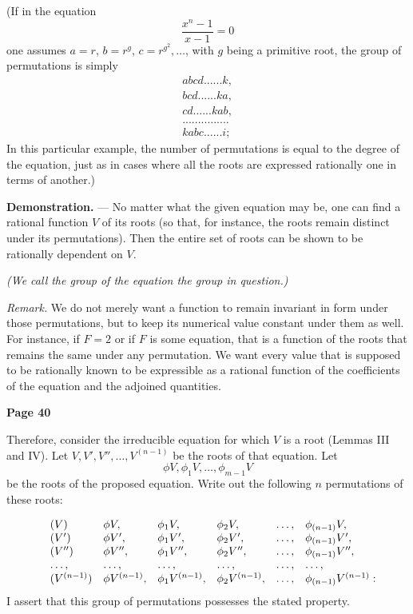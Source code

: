 \documentclass{article}
\begin{document}
\smallskip

\noindent
(If in the equation
\[
\frac{x^n - 1}{x - 1} = 0
\]
one assumes \(a = r\), \(b = r^g\), \(c = r^{g^2}, \dots\), with \(g\) being a primitive root, the group of permutations is simply
\[
\begin{matrix}
abcd......k,\\
bcd......ka,\\
cd......kab,\\
...............\\
kabc......i;
\end{matrix}
\]
In this particular example, the number of permutations is equal to the degree of the equation, just as in cases where all the roots are expressed rationally one in terms of another.)

\medskip

\noindent
\textbf{Demonstration.} --- No matter what the given equation may be, one can find a rational function \(V\) of its roots (so that, for instance, the roots remain distinct under its permutations). Then the entire set of roots can be shown to be rationally dependent on \(V\).

\medskip

\noindent
\emph{(We call the group of the equation the group in question.)}

\smallskip

\noindent
\emph{Remark.} We do not merely want a function to remain invariant in form under those permutations, but to keep its numerical value constant under them as well. For instance, if \(F = 2\) or if \(F\) is some equation, that is a function of the roots that remains the same under any permutation. We want every value that is supposed to be rationally known to be expressible as a rational function of the coefficients of the equation and the adjoined quantities.

\bigskip

\noindent
\textbf{Page 40}

\medskip

\noindent
Therefore, consider the irreducible equation for which \(V\) is a root (Lemmas III and IV). Let \(V, V', V'', \dots, V^{(n-1)}\) be the roots of that equation. Let 
\[\phi V, \phi_1 V, \dots, \phi_{m-1} V\]
be the roots of the proposed equation. Write out the following \(n\) permutations of these roots:

\[
\begin{array}{l l l l l l l}
&(V) & \phi V, & \phi_1 V, & \phi_2 V, & \dots, & \phi_{(n-1)} V, \\
&(V') & \phi V', & \phi_1 V', & \phi_2 V', & \dots, & \phi_{(n-1)} V', \\
&(V'') & \phi V'', & \phi_1 V'', & \phi_2 V'', & \dots, & \phi_{(n-1)} V'', \\
&\dots,&\dots,&\dots,&\dots,&\dots,&\dots, \\
&(V^{(n-1)}) & \phi V^{(n-1)}, & \phi_1 V^{(n-1)}, & \phi_2 V^{(n-1)}, & \dots, & \phi_{(n-1)}V^{(n-1)}:
\end{array}
\]
\noindent
I assert that this group of permutations possesses the stated property. 
\end{document}
